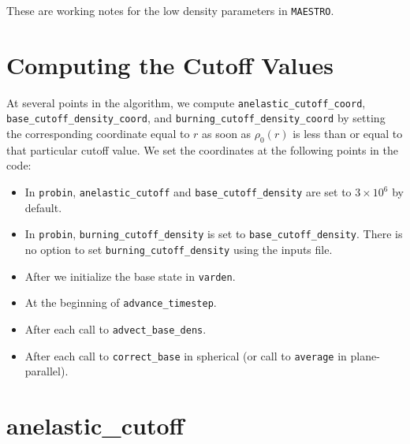 These are working notes for the low density parameters in {\tt MAESTRO}.

\section{Computing the Cutoff Values}

At several points in the algorithm, we compute {\tt anelastic\_cutoff\_coord}, 
{\tt base\_cutoff\_density\_coord}, and {\tt burning\_cutoff\_density\_coord} by 
setting the corresponding coordinate equal to $r$ as soon as $\rho_0(r)$ is less than 
or equal to that particular cutoff value.  We set the coordinates at the following 
points in the code:

\begin{itemize}

\item In {\tt probin}, {\tt anelastic\_cutoff} and {\tt base\_cutoff\_density} are
  set to $3\times 10^6$ by default.

\item In {\tt probin}, {\tt burning\_cutoff\_density} is set to 
  {\tt base\_cutoff\_density}.  There is no option to set 
  {\tt burning\_cutoff\_density} using the inputs file.

\item After we initialize the base state in {\tt varden}.

\item At the beginning of {\tt advance\_timestep}.

\item After each call to {\tt advect\_base\_dens}.

\item After each call to {\tt correct\_base} in spherical 
  (or call to {\tt average} in plane-parallel).

\end{itemize}

\section{anelastic\_cutoff}\label{Sec:Anelastic Cutoff}

